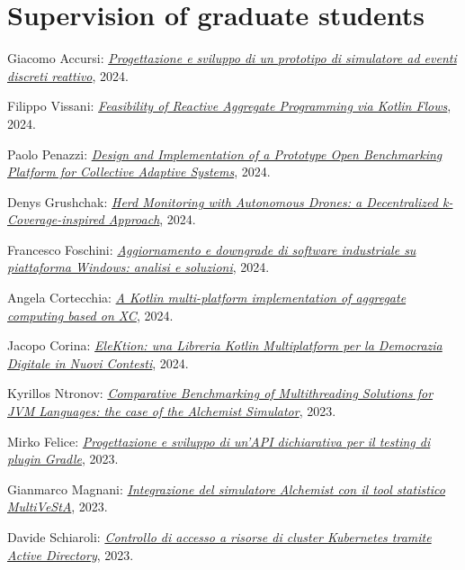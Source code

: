 \section{Supervision of graduate students}
\vspace{-1em}
\begin{innerlist}
    \item Giacomo Accursi: \href{https://amslaurea.unibo.it/31065/}{\textit{Progettazione e sviluppo di un prototipo di simulatore ad eventi discreti reattivo}}, 2024.
    \item Filippo Vissani: \href{https://amslaurea.unibo.it/31108/}{\textit{Feasibility of Reactive Aggregate Programming via Kotlin Flows}}, 2024.
    \item Paolo Penazzi: \href{https://amslaurea.unibo.it/31110/}{\textit{Design and Implementation of a Prototype Open Benchmarking Platform for Collective Adaptive Systems}}, 2024.
    \item Denys Grushchak: \href{https://amslaurea.unibo.it/31105/}{\textit{Herd Monitoring with Autonomous Drones: a Decentralized k-Coverage-inspired Approach}}, 2024.
    \item Francesco Foschini: \href{https://amslaurea.unibo.it/31121/}{\textit{Aggiornamento e downgrade di software industriale su piattaforma Windows: analisi e soluzioni}}, 2024.
    \item Angela Cortecchia: \href{https://amslaurea.unibo.it/31080/}{\textit{A Kotlin multi-platform implementation of aggregate computing based on XC}}, 2024.
    \item Jacopo Corina: \href{https://amslaurea.unibo.it/31132/}{\textit{EleKtion: una Libreria Kotlin Multiplatform per la Democrazia Digitale in Nuovi Contesti}}, 2024.
    \item Kyrillos Ntronov: \href{https://amslaurea.unibo.it/29647/}{\textit{Comparative Benchmarking of Multithreading Solutions for JVM Languages: the case of the Alchemist Simulator}}, 2023.
    \item Mirko Felice: \href{https://amslaurea.unibo.it/29136/}{\textit{Progettazione e sviluppo di un'API dichiarativa per il testing di plugin Gradle}}, 2023.
    \item Gianmarco Magnani: \href{https://amslaurea.unibo.it/28184/}{\textit{Integrazione del simulatore Alchemist con il tool statistico MultiVeStA}}, 2023.
    \item Davide Schiaroli: \href{https://amslaurea.unibo.it/28132/}{\textit{Controllo di accesso a risorse di cluster Kubernetes tramite Active Directory}}, 2023.

\end{innerlist}
